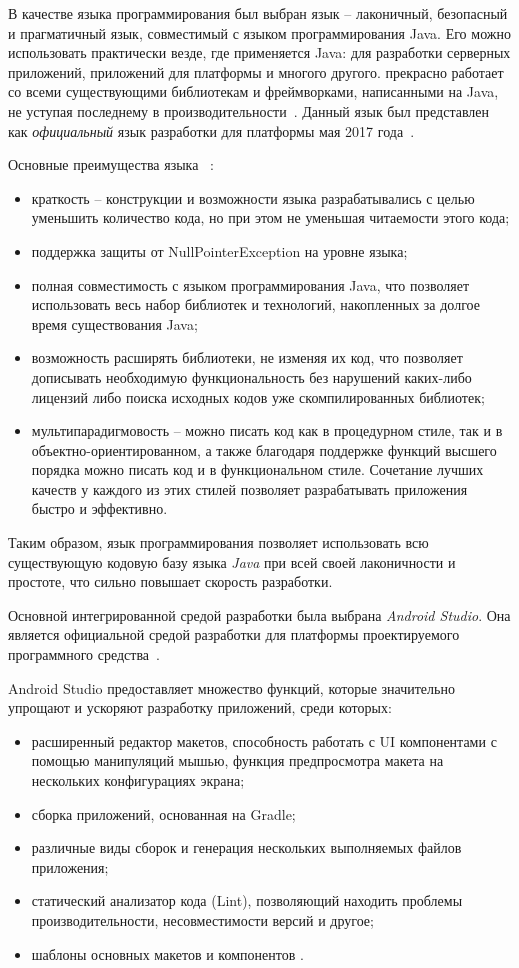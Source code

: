 В качестве языка программирования был выбран язык \emph{\kt} -- лаконичный, безопасный и прагматичный язык, совместимый с языком программирования Java.
Его можно использовать практически везде, где применяется Java: для разработки серверных приложений, приложений для платформы \andro и многого другого.
\kt прекрасно работает со всеми существующими библиотекам и фреймворками, написанными на Java, не уступая последнему в производительности~\cite{kotlin_in_action}.
Данный язык был представлен как \emph{официальный} язык разработки для платформы  мая 2017 года~\cite{kotlin_and_android}.

Основные преимущества языка \kt~\cite{kotlin_doc}:
\begin{itemize}
  \item краткость -- конструкции и возможности языка разрабатывались с целью уменьшить 
  количество кода, но при этом не уменьшая читаемости этого кода;
  \item поддержка защиты от NullPointerException на уровне языка;
  \item полная совместимость с языком программирования Java, что позволяет использовать
  весь набор библиотек и технологий, накопленных за долгое время существования Java;
  \item возможность расширять библиотеки, не изменяя их код, что позволяет дописывать необходимую 
  функциональность без нарушений каких-либо лицензий либо поиска исходных кодов уже 
  скомпилированных библиотек;
  \item мультипарадигмовость -- \kt можно писать код как в процедурном стиле, так и в 
  объектно-ориентированном, а также благодаря поддержке функций высшего порядка можно 
  писать код и в функциональном стиле. Сочетание лучших качеств у каждого из этих стилей 
  позволяет разрабатывать приложения быстро и эффективно.
\end{itemize}

Таким образом, язык программирования \kt позволяет использовать всю существующую кодовую базу языка \emph{Java} при всей своей лаконичности и простоте, что сильно повышает скорость разработки.

Основной интегрированной средой разработки была выбрана \emph{Android Studio}. Она является официальной средой разработки для платформы проектируемого программного средства~\cite{android_studio}. 

Android Studio предоставляет множество функций, которые значительно упрощают и ускоряют разработку приложений, среди которых:
\begin{itemize}
    \item расширенный редактор макетов, способность работать с UI компонентами с помощью манипуляций мышью, функция предпросмотра макета на нескольких конфигурациях экрана;
    \item сборка приложений, основанная на Gradle;
    \item различные виды сборок и генерация нескольких выполняемых файлов приложения;
    \item статический анализатор кода (Lint), позволяющий находить проблемы производительности, несовместимости версий и другое;
    \item шаблоны основных макетов и компонентов \andro.
\end{itemize}